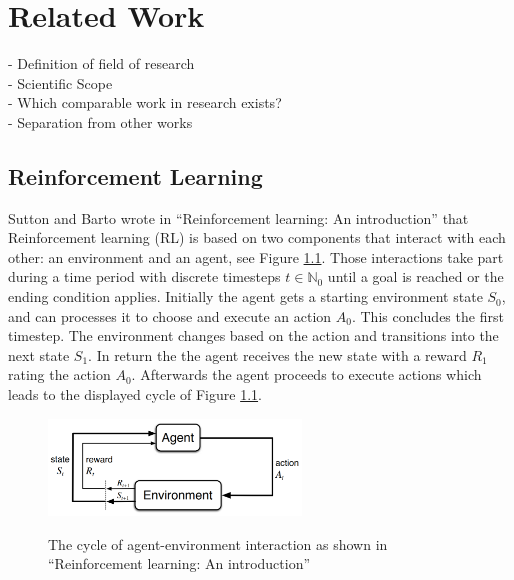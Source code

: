 %
%
\chapter{Related Work}\label{sec:RelatedWork}
- Definition of field of research \\
- Scientific Scope \\
- Which comparable work in research exists? \\
- Separation from other works

\section{Reinforcement Learning}
Sutton and Barto wrote in ``Reinforcement learning: An introduction''\cite{suba18} that Reinforcement learning (RL) is based on two components that interact with each other: an environment and an agent, see Figure \ref{fig:rl_cycle}. Those interactions take part during a time period with discrete timesteps $t\in\mathbb{N}_0$ until a goal is reached or the ending condition applies. Initially the agent gets a starting environment state $S_0$, and can processes it to choose and execute an action $A_0$. This concludes the first timestep. The environment changes based on the action and transitions into the next state $S_{1}$. In return the the agent receives the new state with a reward $R_{1}$ rating the action $A_0$. Afterwards the agent proceeds to execute actions which leads to the displayed cycle of Figure \ref{fig:rl_cycle}.
\begin{figure}[hpbt]
    \centering
    \includegraphics[width=0.6\textwidth]{pictures/RLInteractionSB}\\
    \caption[reinforcement learning cycle]{The cycle of agent-environment interaction as
        shown in ``Reinforcement learning: An introduction''\cite{suba18}}\label{fig:rl_cycle}
\end{figure}

